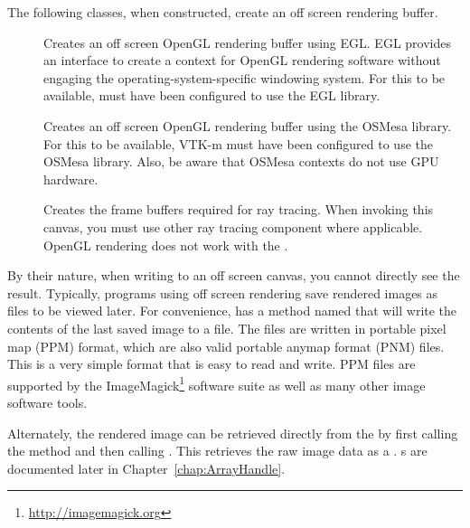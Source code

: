 The following classes, when constructed, create an off screen rendering
buffer.

\begin{description}
\item[]
    
  Creates an off screen OpenGL rendering buffer using EGL.
  EGL provides an interface to create a context for OpenGL rendering software without engaging the operating-system-specific windowing system.
  For this to be available, \VTKm must have been configured to use the EGL library.
\item[] 
    Creates an off screen OpenGL
  rendering buffer using the OSMesa library. For this to be available,
  VTK-m must have been configured to use the OSMesa library. Also, be aware
  that OSMesa contexts do not use GPU hardware.
\item[] 
    Creates the frame
  buffers required for ray tracing. When invoking this canvas, you must use
  other ray tracing component where applicable. OpenGL rendering does not
  work with the .
\end{description}


By their nature, when writing to an off screen canvas, you cannot directly
see the result. Typically, programs using off screen rendering save
rendered images as files to be viewed later. For convenience,
 has a method named  that will
write the contents of the last saved image to a file. The files are written
in portable pixel map (PPM) format,
which are also valid portable
anymap format (PNM) files. This is a very simple format that is easy to
read and write. PPM files are supported by the
ImageMagick\footnote{\url{http://imagemagick.org}} software suite as well
as many other image software tools.


Alternately, the rendered image can be retrieved directly from the
 by first calling the 
method and then calling . This retrieves the raw
image data as a . s are
documented later in Chapter~\ref{chap:ArrayHandle}.

